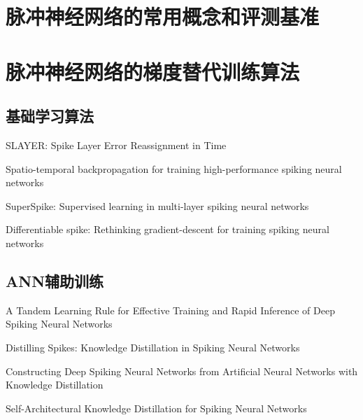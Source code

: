 \documentclass{SCIS2020cn}
\begin{document}
\section{脉冲神经网络的常用概念和评测基准}

\section{脉冲神经网络的梯度替代训练算法}

\subsection{基础学习算法}%


SLAYER: Spike Layer Error Reassignment in Time

Spatio-temporal backpropagation for training high-performance spiking neural networks

SuperSpike: Supervised learning in multi-layer spiking neural networks

Differentiable spike: Rethinking gradient-descent for training spiking neural networks

\subsection{ANN辅助训练}

A Tandem Learning Rule for Effective Training and Rapid Inference of Deep Spiking Neural Networks

Distilling Spikes: Knowledge Distillation in Spiking Neural Networks

Constructing Deep Spiking Neural Networks from Artificial Neural Networks with Knowledge Distillation

Self-Architectural Knowledge Distillation for Spiking Neural Networks
\end{document}
